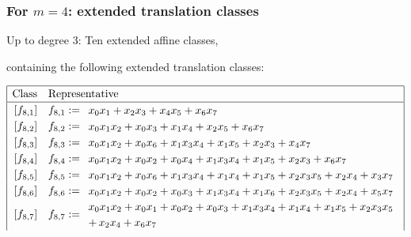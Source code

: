 \documentclass[pdf,sprung,slideColor,nocolorBG]{beamer}
\begin{document}
\begin{frame}
\frametitle{For $m=4$: extended translation classes}

Up to degree 3:
Ten extended affine classes, 

containing the following extended translation classes:

\tiny{}
\begin{align*}
\def\arraystretch{1.2}
\begin{array}{|cl|}
\hline
\text{Class} &
\text{Representative}
\\
\hline
\,[f_{ 8 , 1 }] & f_{ 8 , 1 } :=
\begin{array}{l}
x_{0} x_{1} + x_{2} x_{3} + x_{4} x_{5} + x_{6} x_{7}
\end{array}
\\
\,[f_{ 8 , 2 }] & f_{ 8 , 2 } :=
\begin{array}{l}
x_{0} x_{1} x_{2} + x_{0} x_{3} + x_{1} x_{4} + x_{2} x_{5} + x_{6} x_{7}
\end{array}
\\
\,[f_{ 8 , 3 }] & f_{ 8 , 3 } :=
\begin{array}{l}
x_{0} x_{1} x_{2} + x_{0} x_{6} + x_{1} x_{3} x_{4} + x_{1} x_{5} + x_{2} x_{3} + x_{4} x_{7}
\end{array}
\\
\,[f_{ 8 , 4 }] & f_{ 8 , 4 } :=
\begin{array}{l}
x_{0} x_{1} x_{2} + x_{0} x_{2} + x_{0} x_{4} + x_{1} x_{3} x_{4} + x_{1} x_{5} + x_{2} x_{3} + x_{6} x_{7}
\end{array}
\\
\,[f_{ 8 , 5 }] & f_{ 8 , 5 } :=
\begin{array}{l}
x_{0} x_{1} x_{2} + x_{0} x_{6} + x_{1} x_{3} x_{4} + x_{1} x_{4} + x_{1} x_{5} + x_{2} x_{3} x_{5} + x_{2} x_{4} + x_{3} x_{7}
\end{array}
\\
\,[f_{ 8 , 6 }] & f_{ 8 , 6 } :=
\begin{array}{l}
x_{0} x_{1} x_{2} + x_{0} x_{2} + x_{0} x_{3} + x_{1} x_{3} x_{4} + x_{1} x_{6} + x_{2} x_{3} x_{5} + x_{2} x_{4} + x_{5} x_{7}
\end{array}
\\
\,[f_{ 8 , 7 }] & f_{ 8 , 7 } :=
\begin{array}{l}
x_{0} x_{1} x_{2} + x_{0} x_{1} + x_{0} x_{2} + x_{0} x_{3} + x_{1} x_{3} x_{4} + x_{1} x_{4} + x_{1} x_{5} + x_{2} x_{3} x_{5} 
\\
+\,  x_{2} x_{4} + x_{6} x_{7}
\end{array}

\end{array}
\end{align*}
\end{frame}
\end{document}
